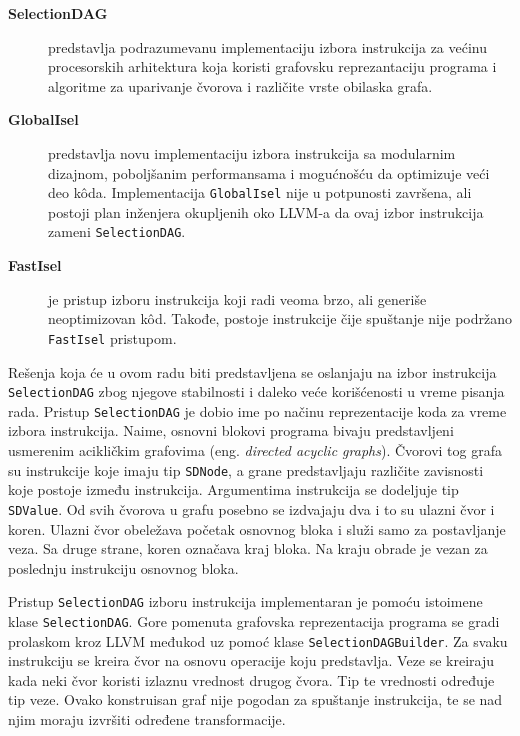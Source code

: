 \documentclass[12pt,oneside]{memoir}
\begin{document}
\begin{description}
\item[\textbf{SelectionDAG}] predstavlja podrazumevanu implementaciju izbora instrukcija za većinu procesorskih arhitektura koja koristi grafovsku reprezantaciju programa i algoritme za uparivanje čvorova i različite vrste obilaska grafa.

\item[\textbf{GlobalIsel}] predstavlja novu implementaciju izbora instrukcija sa modularnim dizajnom,
poboljšanim performansama i mogućnošću da optimizuje veći deo kôda. 
Implementacija \texttt{GlobalIsel} nije u potpunosti završena, ali postoji plan inženjera okupljenih oko LLVM-a da ovaj izbor instrukcija zameni \texttt{SelectionDAG}.

\item[\textbf{FastIsel}] je pristup izboru instrukcija koji radi veoma brzo, ali generiše neoptimizovan k\^od. Takođe, postoje instrukcije čije spuštanje nije podržano \texttt{FastIsel} pristupom. 
\end{description}
Rešenja koja će u ovom radu biti predstavljena se oslanjaju na izbor instrukcija \texttt{SelectionDAG} zbog njegove stabilnosti i daleko veće korišćenosti u vreme pisanja rada.
Pristup \texttt{SelectionDAG} je dobio ime po načinu reprezentacije koda za
vreme izbora instrukcija. Naime, osnovni blokovi programa bivaju predstavljeni usmerenim acikličkim grafovima (eng. \textit{directed acyclic graphs}). Čvorovi tog grafa su instrukcije koje imaju tip \texttt{SDNode}, a grane predstavljaju različite zavisnosti koje postoje između instrukcija. Argumentima instrukcija se dodeljuje tip \texttt{SDValue}. Od svih čvorova u grafu posebno se izdvajaju dva i to su ulazni čvor i koren. Ulazni čvor obeležava početak osnovnog bloka i služi samo za postavljanje veza. Sa druge strane, koren označava kraj bloka. Na kraju obrade je vezan za poslednju instrukciju osnovnog bloka.

Pristup \texttt{SelectionDAG}  izboru instrukcija implementaran je pomoću istoimene klase \texttt{SelectionDAG}. Gore pomenuta grafovska reprezentacija programa se gradi prolaskom kroz LLVM međukod uz pomoć klase \texttt{SelectionDAGBuilder}. Za svaku instrukciju se kreira čvor na osnovu operacije koju predstavlja. Veze se kreiraju kada neki čvor
koristi izlaznu vrednost drugog čvora. Tip te vrednosti određuje tip veze. Ovako konstruisan graf nije pogodan za spuštanje instrukcija, te se nad njim moraju izvršiti određene transformacije. 
\end{document}
